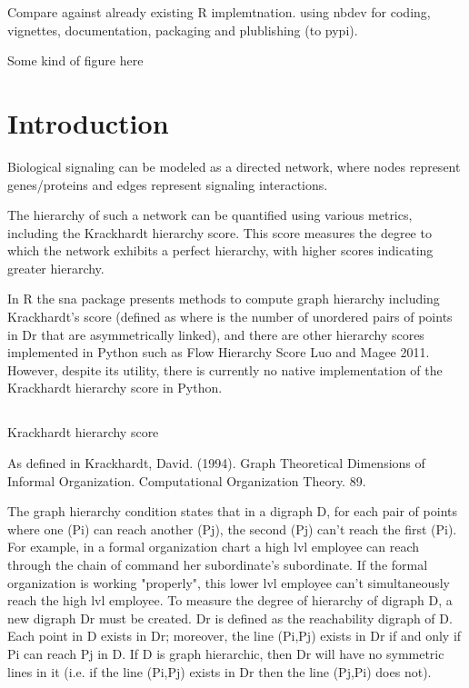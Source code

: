 Compare against already existing R implemtnation.
using nbdev for coding, vignettes, documentation, packaging and plublishing (to pypi).

Some kind of figure here

\section*{Introduction}

Biological signaling can be modeled as a directed network, where nodes represent genes/proteins and edges represent signaling interactions.

The hierarchy of such a network can be quantified using various metrics, including the Krackhardt hierarchy score. This score measures the degree to which the network exhibits a perfect hierarchy, with higher scores indicating greater hierarchy.

In R the sna package presents methods to compute graph hierarchy including Krackhardt’s score (defined as
where is the number of unordered pairs of points in Dr that are asymmetrically linked), and there are other hierarchy scores implemented in Python such as Flow Hierarchy Score Luo and Magee 2011. However, despite its utility, there is currently no native implementation of the Krackhardt hierarchy score in Python.

\subsection{}{Krackhardt hierarchy score}

As defined in Krackhardt, David. (1994). Graph Theoretical Dimensions of Informal Organization. Computational Organization Theory. 89.

The graph hierarchy condition states that in a digraph D, for each pair of points where one (Pi) can reach another (Pj), the second (Pj) can't reach the first (Pi). 
For example, in a formal organization chart a high lvl employee can reach through the chain of command her subordinate's subordinate. If the formal organization is working "properly", this lower lvl employee can't simultaneously reach the high lvl employee.
To measure the degree of hierarchy of digraph D, a new digraph Dr must be created. Dr is defined as the reachability digraph of D. Each point in D exists in Dr; moreover, the line (Pi,Pj) exists in Dr if and only if Pi can reach Pj in D. If D is graph hierarchic, then Dr will have no symmetric lines in it (i.e. if the line (Pi,Pj) exists in Dr then the line (Pj,Pi) does not).

